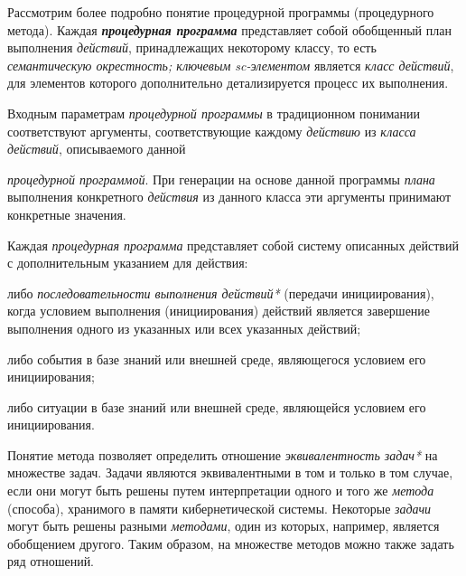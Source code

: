 \begin{SCn}
	\begin{scnindent}
	\end{scnindent}
\end{SCn}

Рассмотрим более подробно понятие процедурной программы (процедурного метода). Каждая \textbf{\textit{процедурная программа}} представляет собой обобщенный план выполнения \textit{действий}, принадлежащих некоторому классу, то есть \textit{семантическую окрестность; ключевым sc-элементом\scnrolesign} является \textit{класс действий}, для элементов которого дополнительно детализируется процесс их выполнения.

Входным параметрам \textit{процедурной программы} в традиционном понимании соответствуют аргументы, соответствующие каждому \textit{действию} из \textit{класса действий}, описываемого данной {\textit{процедурной программой}. При генерации на основе данной программы \textit{плана} выполнения конкретного \textit{действия} из данного класса эти аргументы принимают конкретные значения.

Каждая \textit{процедурная программа} представляет собой систему описанных действий с дополнительным указанием для действия:
\begin{textitemize}
	\item либо \textit{последовательности выполнения действий*} (передачи инициирования), когда условием выполнения (инициирования) действий является завершение выполнения одного из указанных или всех указанных действий;
	\item либо события в базе знаний или внешней среде, являющегося условием его инициирования;
	\item либо ситуации в базе знаний или внешней среде, являющейся условием его инициирования.
\end{textitemize}
}

Понятие метода позволяет определить отношение \textit{эквивалентность задач*} на множестве задач. Задачи являются эквивалентными в том и только в том случае, если они могут быть решены путем интерпретации одного и того же \textit{метода} (способа), хранимого в памяти кибернетической системы.
Некоторые \textit{задачи} могут быть решены разными \textit{методами}, один из которых, например, является обобщением другого. Таким образом, на множестве методов можно также задать ряд отношений.

